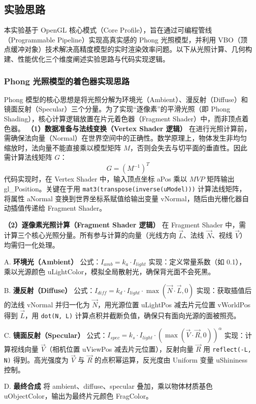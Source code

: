 \documentclass[a4paper]{article}
\begin{document}
\subsection{实验思路}
本实验基于 OpenGL 核心模式（Core Profile），旨在通过可编程管线（Programmable Pipeline）实现高真实感的 Phong 光照模型，并利用 VBO（顶点缓冲对象）技术解决高精度模型的实时渲染效率问题。以下从光照计算、几何构建、性能优化三个维度阐述实验思路与代码实现逻辑。
\subsubsection{Phong 光照模型的着色器实现思路}
Phong 模型的核心思想是将光照分解为环境光（Ambient）、漫反射（Diffuse）和镜面反射（Specular）三个分量。为了实现“逐像素”的平滑光照（即 Phong Shading），核心计算逻辑放置在片元着色器（Fragment Shader）中，而非顶点着色器。
\textbf{（1）数据准备与法线变换（Vertex Shader 逻辑）}
在进行光照计算前，需确保法向量（Normal）在世界空间中的正确性。数学原理上，物体发生非均匀缩放时，法向量不能直接乘以模型矩阵 $M$，否则会失去与切平面的垂直性。因此需计算法线矩阵 $G$：
$$
G = (M^{-1})^T
$$
代码实现时，在 Vertex Shader 中，输入顶点坐标 aPos 乘以 $MVP$ 矩阵输出 gl\_Position。关键在于用 \texttt{mat3(transpose(inverse(uModel)))} 计算法线矩阵，将属性 aNormal 变换到世界坐标系赋值给输出变量 vNormal，随后由光栅化器自动插值传递给 Fragment Shader。

\textbf{（2）逐像素光照计算（Fragment Shader 逻辑）}
在 Fragment Shader 中，需计算三个核心光照分量。所有参与计算的向量（光线方向 $\vec{L}$、法线 $\vec{N}$、视线 $\vec{V}$）均需归一化处理。

A. \textbf{环境光（Ambient）}
公式：$I_{amb} = k_a \cdot I_{light}$
实现：定义常量系数（如 0.1），乘以光源颜色 uLightColor，模拟全局散射光，确保背光面不会死黑。

B. \textbf{漫反射（Diffuse）}
公式：$I_{diff} = k_d \cdot I_{light} \cdot \max(\vec{N} \cdot \vec{L}, 0)$
实现：获取插值后的法线 vNormal 并归一化为 $\vec{N}$，用光源位置 uLightPos 减去片元位置 vWorldPos 得到 $\vec{L}$，用 \texttt{dot(N, L)} 计算点积并截断负值，确保只有面向光源的面被照亮。

C. \textbf{镜面反射（Specular）}
公式：$I_{spec} = k_s \cdot I_{light} \cdot (\max(\vec{V} \cdot \vec{R}, 0))^{\alpha}$
实现：计算视线向量 $\vec{V}$（相机位置 uViewPos 减去片元位置），反射向量 $\vec{R}$ 用 \texttt{reflect(-L, N)} 得到。高光强度为 $\vec{V}$ 与 $\vec{R}$ 的点积幂运算，反光度由 Uniform 变量 uShininess 控制。

D. \textbf{最终合成}
将 ambient、diffuse、specular 叠加，乘以物体材质基色 uObjectColor，输出为最终片元颜色 FragColor。
\end{document}
